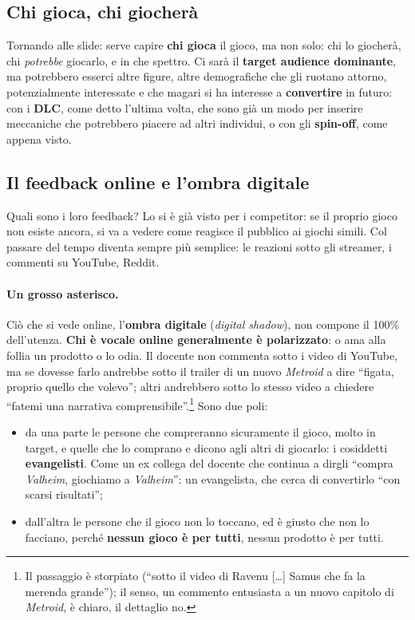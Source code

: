 \subsection{Chi gioca, chi giocherà}

Tornando alle slide: serve capire \textbf{chi gioca} il gioco, ma non solo:
chi lo giocherà, chi \emph{potrebbe} giocarlo, e in che spettro. Ci sarà il
\textbf{target audience dominante}, ma potrebbero esserci altre figure, altre
demografiche che gli ruotano attorno, potenzialmente interessate e che magari
si ha interesse a \textbf{convertire} in futuro: con i \textbf{DLC}, come detto
l'ultima volta, che sono già un modo per inserire meccaniche che potrebbero
piacere ad altri individui, o con gli \textbf{spin-off}, come appena visto.

\subsection{Il feedback online e l'ombra digitale}

Quali sono i loro feedback? Lo si è già visto per i competitor: se il proprio
gioco non esiste ancora, si va a vedere come reagisce il pubblico ai giochi
simili. Col passare del tempo diventa sempre più semplice: le reazioni sotto
gli streamer, i commenti su YouTube, Reddit.

\paragraph{Un grosso asterisco.} Ciò che si vede online, l'\textbf{ombra
digitale} (\emph{digital shadow}), non compone il 100\% dell'utenza.
\textbf{Chi è vocale online generalmente è polarizzato}: o ama alla follia un
prodotto o lo odia. Il docente non commenta sotto i video di YouTube, ma se
dovesse farlo andrebbe sotto il trailer di un nuovo \emph{Metroid} a dire
``figata, proprio quello che volevo''; altri andrebbero sotto lo stesso video
a chiedere ``fatemi una narrativa comprensibile''.\footnote{Il passaggio è
storpiato (``sotto il video di Ravenu [\dots] Samus che fa la merenda
grande''); il senso, un commento entusiasta a un nuovo capitolo di
\emph{Metroid}, è chiaro, il dettaglio no.} Sono due poli:
\begin{itemize}
  \item da una parte le persone che compreranno sicuramente il gioco, molto in
        target, e quelle che lo comprano e dicono agli altri di giocarlo: i
        cosiddetti \textbf{evangelisti}. Come un ex collega del docente che
        continua a dirgli ``compra \emph{Valheim}, giochiamo a
        \emph{Valheim}'': un evangelista, che cerca di convertirlo ``con
        scarsi risultati'';
  \item dall'altra le persone che il gioco non lo toccano, ed è giusto che
        non lo facciano, perché \textbf{nessun gioco è per tutti}, nessun
        prodotto è per tutti.
\end{itemize}

